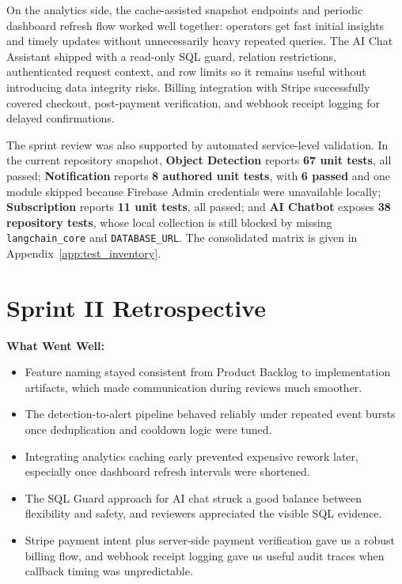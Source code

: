 \documentclass[12pt,a4paper,oneside]{report}
\begin{document}
\hspace{0.8cm}On the analytics side, the cache-assisted snapshot endpoints and periodic dashboard refresh flow worked well together: operators get fast initial insights and timely updates without unnecessarily heavy repeated queries. The AI Chat Assistant shipped with a read-only SQL guard, relation restrictions, authenticated request context, and row limits so it remains useful without introducing data integrity risks. Billing integration with Stripe successfully covered checkout, post-payment verification, and webhook receipt logging for delayed confirmations.

\hspace{0.8cm}The sprint review was also supported by automated service-level validation. In the current repository snapshot, \textbf{Object Detection} reports \textbf{67 unit tests}, all passed; \textbf{Notification} reports \textbf{8 authored unit tests}, with \textbf{6 passed} and one module skipped because Firebase Admin credentials were unavailable locally; \textbf{Subscription} reports \textbf{11 unit tests}, all passed; and \textbf{AI Chatbot} exposes \textbf{38 repository tests}, whose local collection is still blocked by missing \texttt{langchain\_core} and \texttt{DATABASE\_URL}. The consolidated matrix is given in Appendix~\ref{app:test_inventory}.

\section{Sprint II Retrospective}
\label{sec:s2_retrospective}

\textbf{What Went Well:}
\begin{itemize}
  \item Feature naming stayed consistent from Product Backlog to implementation artifacts, which made communication during reviews much smoother.
  \item The detection-to-alert pipeline behaved reliably under repeated event bursts once deduplication and cooldown logic were tuned.
  \item Integrating analytics caching early prevented expensive rework later, especially once dashboard refresh intervals were shortened.
  \item The SQL Guard approach for AI chat struck a good balance between flexibility and safety, and reviewers appreciated the visible SQL evidence.
  \item Stripe payment intent plus server-side payment verification gave us a robust billing flow, and webhook receipt logging gave us useful audit traces when callback timing was unpredictable.
\end{itemize}
\end{document}

